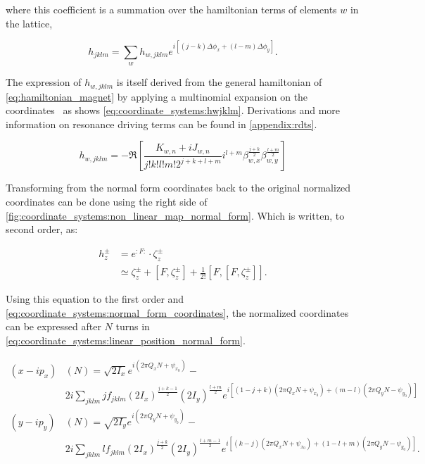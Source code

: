 where this coefficient is a summation over the hamiltonian terms of elements $w$ in the lattice,

\begin{equation}
    h_{jklm} = \sum_w h_{w,jklm} e^{i [(j-k)\Delta \phi_x + (l-m) \Delta \phi_y]}.
\end{equation}

The expression of $h_{w,jklm}$ is itself derived from the general hamiltonian 
of \cref{eq:hamiltonian_magnet} by applying a multinomial expansion on the
coordinates~\cite{franchi_studies_2006} as shows \cref{eq:coordinate_systems:hwjklm}.
Derivations and more information on resonance driving terms can be found in \cref{appendix:rdts}.

\begin{equation}
    h_{w,jklm} = -\Re \left[\frac{K_{w,n} + iJ_{w,n}}{j!k!l!m! 2^{j+k+l+m}}
    i^{l+m} \beta_{w,x}^{\frac{j+k}{2}} \beta_{w,y}^{\frac{l+m}{2}} \right]
    \label{eq:coordinate_systems:hwjklm}
\end{equation}

Transforming from the normal form coordinates back to the original normalized coordinates can be
done using the right side of \cref{fig:coordinate_systems:non_linear_map_normal_form}. Which is
written, to second order, as:

\begin{equation}
    \begin{aligned}
        h_z^{ \pm} &= e^{: F:} \cdot \zeta_z^{ \pm} \\
                   &\simeq \zeta_z^{ \pm}+\left[F, \zeta_z^{ \pm}\right] 
                        + \frac{1}{2!} \left[ F, \left[ F, \zeta_z^\pm \right]\right].
    \end{aligned}
\end{equation}

Using this equation to the first order and \cref{eq:coordinate_systems:normal_form_coordinates}, the
normalized coordinates can be expressed after $N$ turns in
\cref{eq:coordinate_systems:linear_position_normal_form}.

\small
\begin{equation}
    \begin{aligned}
    (x-ip_x)&(N)= \sqrt{2 I_x} e^{i\left(2 \pi Q_x N+\psi_{x_0}\right)}- \\
    & 2 i \sum_{j k l m} j f_{j k l m}\left(2 I_x\right)^{\frac{j+k-1}{2}}\left(2 I_y\right)^{\frac{l+m}{2}} e^{i\left[(1-j+k)\left(2 \pi Q_x N+\psi_{x_0}\right)+(m-l)\left(2 \pi Q_y N-\psi_{y_0}\right)\right]} \\
    (y-ip_y)&(N)= \sqrt{2 I_y} e^{i\left(2 \pi Q_y N+\psi_{y_0}\right)}- \\
    & 2 i \sum_{j k l m} l f_{j k l m}\left(2 I_x\right)^{\frac{j+k}{2}}\left(2 I_y\right)^{\frac{l+m-1}{2}} e^{i\left[(k-j)\left(2 \pi Q_x N+\psi_{x_0}\right)+(1-l+m)\left(2 \pi Q_y N-\psi_{y_0}\right)\right]} .
    \end{aligned}
    \label{eq:coordinate_systems:linear_position_normal_form}
\end{equation}
\normalsize

